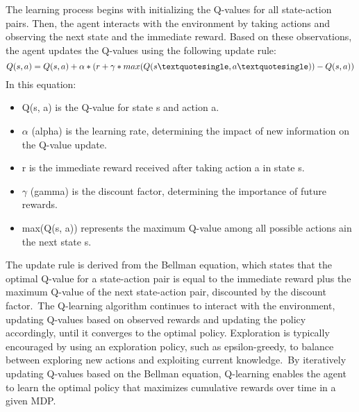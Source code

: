 The learning process begins with initializing the Q-values for all state-action pairs. Then, the agent interacts with the environment by taking actions and observing the next state and the immediate reward. Based on these observations, the agent updates the Q-values using the following update rule:
$$Q(s,a)=Q(s,a)+\alpha*(r+\gamma* max(Q(s\textquotesingle,a\textquotesingle))-Q(s,a))$$
In this equation:
\begin{itemize}
	\item Q(s, a) is the Q-value for state s and action a.
	\item $\alpha$ (alpha) is the learning rate, determining the impact of new information on the Q-value update.
	\item r is the immediate reward received after taking action a in state s.
	\item $\gamma$ (gamma) is the discount factor, determining the importance of future rewards.
	\item max(Q(s\textquotesingle, a\textquotesingle)) represents the maximum Q-value among all possible actions a\textquotesingle in the next state s\textquotesingle.
\end{itemize}
The update rule is derived from the Bellman equation, which states that the optimal Q-value for a state-action pair is equal to the immediate reward plus the maximum Q-value of the next state-action pair, discounted by the discount factor. The Q-learning algorithm continues to interact with the environment, updating Q-values based on observed rewards and updating the policy accordingly, until it converges to the optimal policy. Exploration is typically encouraged by using an exploration policy, such as epsilon-greedy, to balance between exploring new actions and exploiting current knowledge. By iteratively updating Q-values based on the Bellman equation, Q-learning enables the agent to learn the optimal policy that maximizes cumulative rewards over time in a given MDP.
